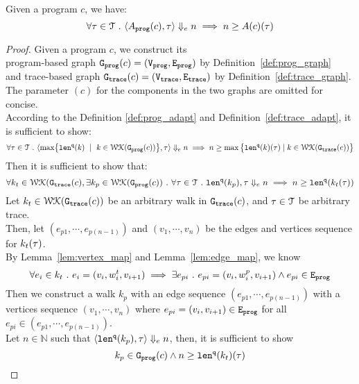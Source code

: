   \begin{thm}
    \label{thm:adaptfun_soundness}
  Given a program ${c}$, we have:
  \[
    \forall \mathtt{\tau} \in \mathcal{T} ~.~ 
    \langle A_{\mathtt{prog}}(c), \mathtt{\tau} \rangle \Downarrow_e n \implies n \geq A(c)(\mathtt{\tau})
  \]
  \end{thm}
\begin{proof}
Given a program ${c}$, 
we construct its 
\\
program-based graph $\mathtt{{G_{prog}}}({c}) = (\mathtt{{V_{prog}}}, \mathtt{{E_{prog}}})$
by Definition~\ref{def:prog_graph}
\\ and 
trace-based graph $\mathtt{{G_{trace}}}({c}) = (\mathtt{{V_{trace}}}, \mathtt{{E_{trace}}})$  by Definition~\ref{def:trace_graph}.
\\
The parameter $(c)$ for the components in the two graphs are omitted for concise.
\\
%
According to the Definition \ref{def:prog_adapt} and Definition~\ref{def:trace_adapt}, it is sufficient to show:
%
$$
\forall \trace \in \mathcal{T} \st
\config{\max\left\{ \qlen(k) \ \mid \  k\in \walks(\progG({c}))\right \}
, \trace } \earrow n \implies
n \geq
\max \big 
\{ \qlen(k)(\trace) \mid k \in \walks(\traceG(c)) \big \} 
$$
%
%
Then it is sufficient to show that:
\[
  \forall 
  k_t \in \mathcal{WK}(\mathtt{{G_{trace}}}({c}),
  \exists k_p \in \mathcal{WK}(\mathtt{{G_{prog}}}({c})) 
  ~.~ \forall \mathtt{\tau} \in \mathcal{T} ~.~
  \mathtt{len}^{\tt q}(k_p), \mathtt{\tau} \Downarrow_e n
   \implies 
  n \geq \mathtt{len}^{\tt q}(k_t(\mathtt{\tau}))
\]
%
Let $k_t\in \mathcal{WK}(\mathtt{{G_{trace}}}(c))$ be an arbitrary walk in $\mathtt{{G_{trace}}}(c)$, 
and $\mathtt{\tau} \in \mathcal{T}$ be arbitrary trace.
\\
Then, 
let $(e_{p1}, \cdots, e_{p(n-1)}) $ and
$(v_1, \cdots, v_n)$ be the edges and vertices sequence  for $k_t(\mathtt{\tau})$.
\\
%
By Lemma~\ref{lem:vertex_map} and Lemma~\ref{lem:edge_map}, we know
%
\[
  \forall e_i \in k_t ~.~ e_i = (v_i, w^t_{i}, v_{i + 1}) \implies
  \exists e_{pi} ~.~ e_{pi} = (v_i, w^p_i, v_{i + 1}) \land e_{pi} \in \mathtt{{E_{prog}}}
  \]
Then we construct a walk $k_p$ with an edge sequence $(e_{p1}, \cdots, e_{p(n-1)}) $ 
with a vertices sequence $(v_1, \cdots, v_n)$ where 
$e_{pi} = (v_i, v_{i + 1}) \in \mathtt{{E_{prog}}}$ for all $e_{pi} \in (e_{p1}, \cdots, e_{p(n-1)})$.
\\
Let $n \in \mathbb{N}$ such that 
$\langle \mathtt{len}^{\tt q}(k_p), \mathtt{\tau} \rangle \Downarrow_e n$,
then, it is sufficient to show
\[
  k_p \in \mathtt{{G_{prog}}}(c) \land n \geq \mathtt{len}^{\tt q}(k_t)(\mathtt{\tau})
  \] 

\end{proof}
